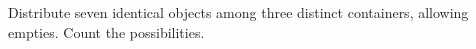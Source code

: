 Distribute seven identical objects among three distinct containers, allowing empties. Count the possibilities.
